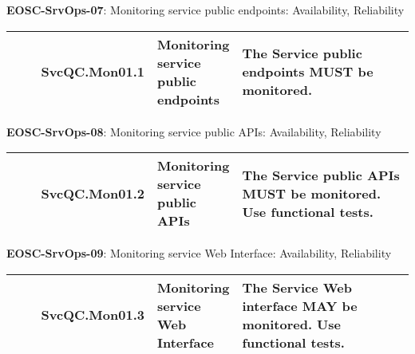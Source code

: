 \textbf{EOSC-SrvOps-07}: Monitoring service public endpoints: Availability, Reliability
\nopagebreak[4]
\begin{center}
    \tabletail{\hline}
    \tiny
    \begin{supertabular}{|p{0.10\linewidth}|p{0.10\linewidth}|p{0.20\linewidth}|p{0.60\linewidth}|} \hline
        \cite{orviz_fernandez_eosc-synergy_2020} & SvcQC.Mon01.1 & Monitoring service public endpoints & The Service public endpoints MUST be monitored.\\ \hline
    \end{supertabular}
\end{center}

\textbf{EOSC-SrvOps-08}: Monitoring service public APIs: Availability, Reliability
\nopagebreak[4]
\begin{center}
    \tabletail{\hline}
    \tiny
    \begin{supertabular}{|p{0.10\linewidth}|p{0.10\linewidth}|p{0.20\linewidth}|p{0.60\linewidth}|} \hline
        \cite{orviz_fernandez_eosc-synergy_2020} & SvcQC.Mon01.2 & Monitoring service public APIs & The Service public APIs MUST be monitored. Use functional tests.\\ \hline
    \end{supertabular}
\end{center}

\textbf{EOSC-SrvOps-09}: Monitoring service Web Interface: Availability, Reliability
\nopagebreak[4]
\begin{center}
    \tabletail{\hline}
    \tiny
    \begin{supertabular}{|p{0.10\linewidth}|p{0.10\linewidth}|p{0.20\linewidth}|p{0.60\linewidth}|} \hline
        \cite{orviz_fernandez_eosc-synergy_2020} & SvcQC.Mon01.3 & Monitoring service Web Interface & The Service Web interface MAY be monitored. Use functional tests.\\ \hline
    \end{supertabular}
\end{center}

